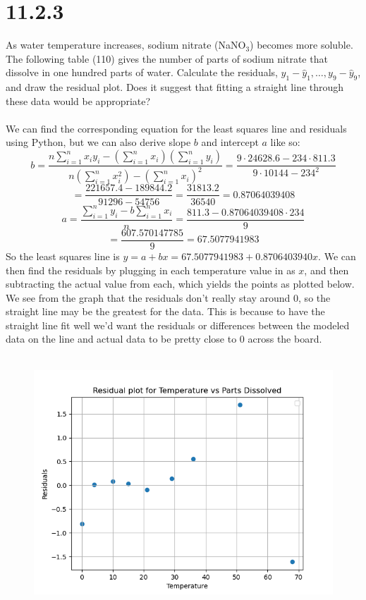 \documentclass{article}
\begin{document}
{\section*{11.2.3}
As water temperature increases, sodium nitrate (NaN\(\text{O}_3\)) becomes more soluble. The following table (110) gives the number of parts of sodium nitrate that dissolve in one hundred parts of water. Calculate the residuals, \(y_1 - \hat{y}_1, \dots, y_9 - \hat{y}_9\), and draw the residual plot. Does it suggest that fitting a straight line through these data would be appropriate?
\\
\\
We can find the corresponding equation for the least squares line and residuals using Python, but we can also derive slope \(b\) and intercept \(a\) like so:
\[
b = \frac{n\sum_{i=1}^n x_i y_i - (\sum_{i=1}^n x_i) (\sum_{i=1}^{n} y_i)}{n(\sum_{i=1}^n x_i^2) - (\sum_{i=1}^{n} x_i)^2} = \frac{9 \cdot 24628.6 - 234 \cdot 811.3}{9 \cdot 10144 - 234^2}
\]
\[
= \frac{221657.4 - 189844.2}{91296 - 54756} = \frac{31813.2}{36540} = 0.87064039408
\]
\[
a = \frac{\sum_{i=1}^{n} y_i - b \sum_{i=1}^{n}x_i}{n} = \frac{811.3 - 0.87064039408 \cdot 234}{9}
\]
\[
= \frac{607.570147785}{9} = 67.5077941983
\]
So the least squares line is \(y = a + bx = 67.5077941983 + 0.8706403940x\). We can then find the residuals by plugging in each temperature value in as \(x\), and then subtracting the actual value from each, which yields the points as plotted below. We see from the graph that the residuals don't really stay around 0, so the straight line may be the greatest for the data. This is because to have the straight line fit well we'd want the residuals or differences between the modeled data on the line and actual data to be pretty close to 0 across the board. 
\\
\\
\begin{figure}[h!]
  \centering
  \includegraphics[width=500pt]{water_1123.png}

\end{figure}}
\end{document}

